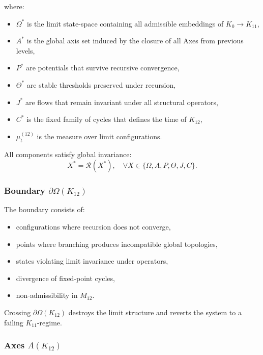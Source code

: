where:
\begin{itemize}
    \item $\Omega^*$ is the limit state-space containing all admissible embeddings
          of $K_0\!\to\!K_{11}$,
    \item $A^*$ is the global axis set induced by the closure of all Axes
          from previous levels,
    \item $P^*$ are potentials that survive recursive convergence,
    \item $\Theta^*$ are stable thresholds preserved under recursion,
    \item $J^*$ are flows that remain invariant under all structural operators,
    \item $C^*$ is the fixed family of cycles that defines the time of $K_{12}$,
    \item $\mu^{(12)}_t$ is the measure over limit configurations.
\end{itemize}

All components satisfy global invariance:
\[
X^* = \mathcal{R}(X^*),\quad \forall X \in \{\Omega, A, P, \Theta, J, C\}.
\]

\subsubsection{Boundary $\partial\Omega(K_{12})$}

The boundary consists of:
\begin{itemize}
    \item configurations where recursion does not converge,
    \item points where branching produces incompatible global topologies,
    \item states violating limit invariance under operators,
    \item divergence of fixed-point cycles,
    \item non-admissibility in $M_{12}$.
\end{itemize}

Crossing $\partial\Omega(K_{12})$ destroys the limit structure and reverts the
system to a failing $K_{11}$-regime.

\subsubsection{Axes $A(K_{12})$}

